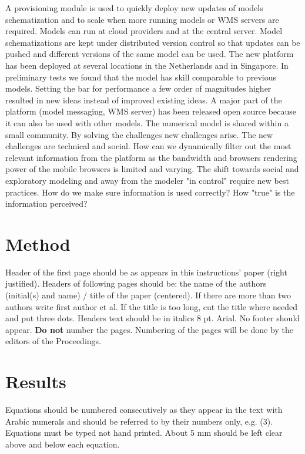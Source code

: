 \documentclass[a4paper]{article}
\begin{document}
A provisioning module is used to quickly deploy new updates of models schematization and to scale when more running models or WMS servers are required. Models can run at cloud providers and at the central server. Model schematizations are kept under distributed version control so that updates can be pushed and different versions of the same model can be used.
The new platform has been deployed at several locations in the Netherlands and in Singapore. In preliminary tests we found that the model has skill comparable to previous models. Setting the bar for performance a few order of magnitudes higher resulted in new ideas instead of improved existing ideas. A major part of the platform (model messaging, WMS server) has been released open source because it can also be used with other models. The numerical model is shared within a small community.
By solving the challenges new challenges arise. The new challenges are technical and social. How can we dynamically filter out the most relevant information from the platform as the bandwidth and browsers rendering power of the mobile browsers is limited and varying. The shift towards social and exploratory modeling and away from the modeler "in control" require new best practices. How do we make sure information is used correctly? How "true" is the information perceived?



\section{Method}

Header of the first page should be as appears in this instructions' paper (right justified). Headers of following pages should be: the name of the authors (initial(s) and name) / title of the paper (centered). If there are more than two authors write first author et al. If the title is too long, cut the title where needed and put three dots. Headers text should be in italics 8 pt. Arial.
No footer should appear. \textbf{Do not} number the pages. Numbering of the pages will be done by the editors of the Proceedings.


\section{Results}
Equations should be numbered consecutively as they appear in the
text with Arabic numerals and should be referred to by their
numbers only, e.g. (3).  Equations must be typed not hand printed.
About 5 mm should be left clear above and below each equation.
\end{document}
